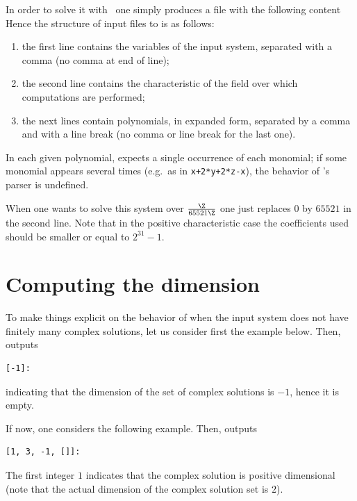 \documentclass[a4paper,english,11pt]{scrartcl}
\theoremstyle{definition}
\theoremstyle{remark}
\begin{document}
In order to solve it with \msolve~one simply produces a file with the following content
Hence the structure of input files to \msolve is as follows:
\begin{enumerate}
\item the first line contains the variables of the input system, separated with
  a comma (no comma at end of line);
\item the second line contains the characteristic of the field over which
  computations are performed;
\item the next lines contain polynomials, in expanded form, separated by a comma
   and with a line break (no comma or line break for the last one).
\end{enumerate}

In each given polynomial, \msolve expects a single occurrence of each monomial;
if some monomial appears several times (e.g.\ as in \verb#x+2*y+2*z-x#),
the behavior of \msolve's parser is undefined.

When one wants to solve this system over $\frac{\Z}{65521\Z}$ one just replaces
$0$ by $65521$ in the second line. Note that in the positive characteristic case
the coefficients used should be smaller or equal to $2^{31}-1$.


\section{Computing the dimension}\label{sec:dim}

To make things explicit on the behavior of \msolve when the input system
does not have finitely many complex solutions, let us consider first the example
below.
Then, \msolve outputs
\begin{tcolorbox} %
  \begin{lstlisting}[basicstyle=\normalsize\ttfamily]
[-1]:
  \end{lstlisting}
\end{tcolorbox}
indicating that the dimension of the set of complex solutions is $-1$, hence it
is empty.

If now, one considers the following example.
Then, \msolve outputs
\begin{tcolorbox} %
  \begin{lstlisting}[basicstyle=\normalsize\ttfamily]
[1, 3, -1, []]:
  \end{lstlisting}
\end{tcolorbox}
The first integer $1$ indicates that the complex solution is positive
dimensional (note that the actual dimension of the complex solution set is $2$).
\end{document}
